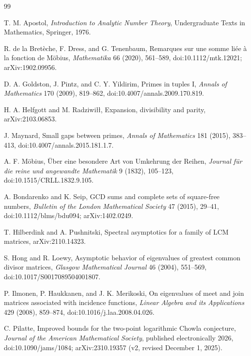 \documentclass[11pt]{amsart}
\numberwithin{equation}{section}
\theoremstyle{plain}
\theoremstyle{definition}
\theoremstyle{remark}
\begin{document}
\begin{thebibliography}{99}

T. M. Apostol,
\emph{Introduction to Analytic Number Theory},
Undergraduate Texts in Mathematics, Springer, 1976.

R. de la Bret\`eche, F. Dress, and G. Tenenbaum,
Remarques sur une somme li\'ee \`a la fonction de M\"obius,
\emph{Mathematika} 66 (2020), 561--589,
doi:10.1112/mtk.12021; arXiv:1902.09956.

D. A. Goldston, J. Pintz, and C. Y. Yildirim,
Primes in tuples I,
\emph{Annals of Mathematics} 170 (2009), 819--862,
doi:10.4007/annals.2009.170.819.

H. A. Helfgott and M. Radziwi{\l}{\l},
Expansion, divisibility and parity,
arXiv:2103.06853.

J. Maynard,
Small gaps between primes,
\emph{Annals of Mathematics} 181 (2015), 383--413,
doi:10.4007/annals.2015.181.1.7.

A. F. M\"obius,
\"Uber eine besondere Art von Umkehrung der Reihen,
\emph{Journal f\"ur die reine und angewandte Mathematik} 9 (1832), 105--123,
doi:10.1515/CRLL.1832.9.105.

A. Bondarenko and K. Seip,
GCD sums and complete sets of square-free numbers,
\emph{Bulletin of the London Mathematical Society} 47 (2015), 29--41,
doi:10.1112/blms/bdu094; arXiv:1402.0249.

T. Hilberdink and A. Pushnitski,
Spectral asymptotics for a family of LCM matrices,
arXiv:2110.14323.

S. Hong and R. Loewy,
Asymptotic behavior of eigenvalues of greatest common divisor matrices,
\emph{Glasgow Mathematical Journal} 46 (2004), 551--569,
doi:10.1017/S0017089504001807.

P. Ilmonen, P. Haukkanen, and J. K. Merikoski,
On eigenvalues of meet and join matrices associated with incidence functions,
\emph{Linear Algebra and its Applications} 429 (2008), 859--874,
doi:10.1016/j.laa.2008.04.026.

C. Pilatte,
Improved bounds for the two-point logarithmic Chowla conjecture,
\emph{Journal of the American Mathematical Society}, published electronically 2026,
doi:10.1090/jams/1084; arXiv:2310.19357 (v2, revised December 1, 2025).


\end{thebibliography}
\end{document}
